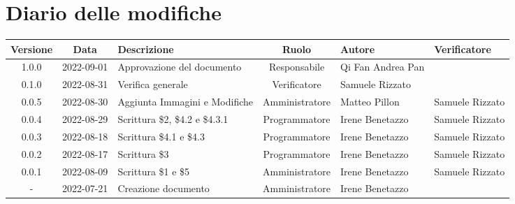 \section*{Diario delle modifiche}
	\begin{center}
	\renewcommand{\arraystretch}{1.8} %
	\begin{longtable}{ |c|c|p{8em}|c|m{5em}|m{6em}| }
	\hline
	\textbf{Versione} & \textbf{Data} & \textbf{Descrizione} &  \textbf{Ruolo} &  \textbf{Autore} & \textbf{Verificatore}\\ %
	\hline %
	1.0.0& 2022-09-01 & Approvazione del documento & Responsabile & Qi Fan Andrea \newline Pan & \\ 	
	\hline
	0.1.0& 2022-08-31 & Verifica generale & Verificatore & Samuele \newline Rizzato & \\ 
	\hline
	0.0.5& 2022-08-30 & Aggiunta Immagini e Modifiche & Amministratore & Matteo \newline Pillon & Samuele \newline Rizzato\\ 
	\hline
	0.0.4& 2022-08-29 & Scrittura \$2, \$4.2 e \$4.3.1 & Programmatore & Irene \newline Benetazzo & Samuele \newline Rizzato\\ 
	\hline
	0.0.3& 2022-08-18 & Scrittura \$4.1 e \$4.3 & Programmatore & Irene \newline Benetazzo & Samuele \newline Rizzato\\ 
	\hline
	0.0.2& 2022-08-17 & Scrittura \$3 & Programmatore & Irene \newline Benetazzo & Samuele \newline Rizzato\\ 
	\hline
	0.0.1& 2022-08-09 & Scrittura \$1 e \$5 & Amministratore & Irene \newline Benetazzo & Samuele \newline Rizzato\\ 
	\hline
    -& 2022-07-21 & Creazione documento & Amministratore & Irene \newline Benetazzo & \\ 
	\hline
	\end{longtable}
	\end{center}
	\newpage